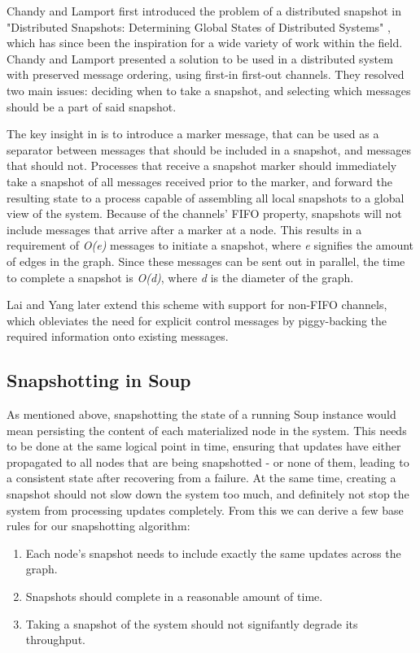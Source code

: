 \documentclass[b5paper]{report}
\begin{document}
Chandy and Lamport first introduced the problem of a distributed snapshot in
"Distributed Snapshots: Determining Global States of Distributed Systems"
\cite{chandy-lamport}, which has since been the inspiration for a wide variety
of work within the field. Chandy and Lamport presented a solution to be used in
a distributed system with preserved message ordering, using first-in first-out
channels. They resolved two main issues: deciding when to take a snapshot, and
selecting which messages should be a part of said snapshot.

The key insight in \cite{chandy-lamport} is to introduce a marker message, that
can be used as a separator between messages that should be included in a
snapshot, and messages that should not. Processes that receive a snapshot marker
should immediately take a snapshot of all messages received prior to the marker,
and forward the resulting state to a process capable of assembling all local
snapshots to a global view of the system. Because of the channels' FIFO
property, snapshots will not include messages that arrive after a marker at a
node. This results in a requirement of \textit{O(e)} messages to initiate a
snapshot, where \textit{e} signifies the amount of edges in the graph. Since
these messages can be sent out in parallel, the time to complete a snapshot is
\textit{O(d)}, where \textit{d} is the diameter of the graph.

Lai and Yang \cite{lai-yang} later extend this scheme with support for non-FIFO
channels, which obleviates the need for explicit control messages by piggy-backing
the required information onto existing messages.

\subsection{Snapshotting in Soup}
As mentioned above, snapshotting the state of a running Soup instance would mean
persisting the content of each materialized node in the system. This needs to be
done at the same logical point in time, ensuring that updates have either
propagated to all nodes that are being snapshotted - or none of them, leading to
a consistent state after recovering from a failure. At the same time,
creating a snapshot should not slow down the system too much, and definitely not
stop the system from processing updates completely. From this we can derive a
few base rules for our snapshotting algorithm:

\begin{enumerate}
  \item Each node's snapshot needs to include exactly the same updates across
    the graph.
  \item Snapshots should complete in a reasonable amount of time.
  \item Taking a snapshot of the system should not signifantly degrade its
    throughput.
\end{enumerate}
\end{document}
